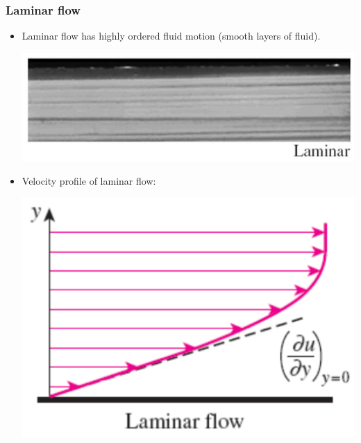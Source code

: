 \documentclass[11pt]{article}
\begin{document}
\subsubsection{Laminar flow}
\label{sec:org360d684}
\begin{itemize}
\item Laminar flow has highly ordered fluid motion (smooth layers of fluid).
\begin{center}
\includegraphics[width=.9\linewidth]{./images/laminar-flow-photo.png}
\end{center}
\item Velocity profile of laminar flow:
\begin{center}
\includegraphics[width=.9\linewidth]{./images/laminar-flow-graph.png}
\end{center}
\end{itemize}

 \newpage
\end{document}
